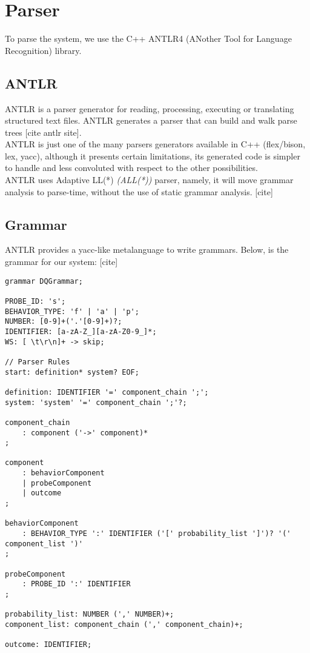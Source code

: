     \section{Parser}
        To parse the system, we use the C++ ANTLR4 (ANother Tool for Language Recognition) library. 
        \subsection{ANTLR}
    ANTLR is a parser generator for reading, processing, executing or translating structured text files. ANTLR generates a parser that can build and walk parse trees [cite antlr site]. \\
 ANTLR is just one of the many parsers generators available in C++ (flex/bison, lex, yacc), although it presents certain limitations, its generated code is simpler to handle and less convoluted with respect to the other possibilities. \\
        ANTLR uses Adaptive LL(*) \textit{(ALL(*))} parser, namely, it will move grammar analysis to parse-time, without the use of static grammar analysis. [cite]

        \subsection{Grammar}
            ANTLR provides a yacc-like metalanguage to write grammars. Below, is the grammar for our system: [cite]
    \begin{verbatim} 
grammar DQGrammar;

PROBE_ID: 's';
BEHAVIOR_TYPE: 'f' | 'a' | 'p';
NUMBER: [0-9]+('.'[0-9]+)?;
IDENTIFIER: [a-zA-Z_][a-zA-Z0-9_]*;
WS: [ \t\r\n]+ -> skip;

// Parser Rules
start: definition* system? EOF;

definition: IDENTIFIER '=' component_chain ';';
system: 'system' '=' component_chain ';'?;

component_chain
    : component ('->' component)*
;

component
    : behaviorComponent
    | probeComponent
    | outcome
;

behaviorComponent
    : BEHAVIOR_TYPE ':' IDENTIFIER ('[' probability_list ']')? '(' component_list ')'
;

probeComponent
    : PROBE_ID ':' IDENTIFIER
;

probability_list: NUMBER (',' NUMBER)+;
component_list: component_chain (',' component_chain)+;

outcome: IDENTIFIER;
    \end{verbatim}
             
